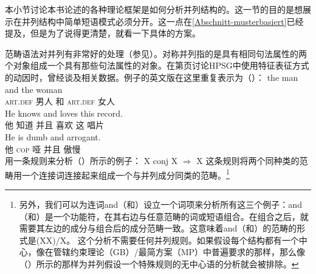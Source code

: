 \begin{exe}
\begin{xlist}[iv.]
\begin{exe}
\begin{xlist}[iv.]
本小节讨论本书论述的各种理论框架是如何分析并列结构的。这一节的目的是想展示在并列结构中简单短语模式必须分开。这一点在\ref{Abschnitt-musterbasiert}已经提及，但是为了说得更清楚，就看一下具体的方案。

范畴语法对并列有非常好的处理（参见\citet{Steedman91a}）。对称并列指的是具有相同句法属性的两个对象组成一个具有那些句法属性的对象。在第\pageref{Seite-HPSG-Koordination}页讨论HPSG中使用特征表征方式的动因时，曾经谈及相关数据。例子的英文版在这里重复表示为（）：
\eal
\ex 
\gll the man and the woman\\
     \textsc{art}.\textsc{def} 男人 和 \textsc{art}.\textsc{def} 女人\\
\ex 
\gll He knows and loves this record.\\
     他 知道 并且 喜欢 这 唱片\\
\ex 
\gll He is dumb and arrogant.\\
     他 \textsc{cop} 哑 并且  傲慢\\
\zl
 \citet{Steedman91a}用一条规则来分析（）所示的例子：
\ea
X conj X $\Rightarrow$ X
\z
这条规则将两个同种类的范畴用一个连接词连接起来组成一个与并列成分同类的范畴。\footnote{%
另外，我们可以为连词and（和）设立一个词项来分析所有这三个例子：and（和）是一个功能符，在其右边与任意范畴的词或短语组合。在组合之后，就需要其左边的成分与组合后的成分范畴一致。这意味着and（和）的范畴的形式是(X\bs X)/X。
这个分析不需要任何并列规则。如果假设每个结构都有一个中心，像在\indexgb 管辖约束理论（GB）/最简方案（MP）\indexmp 中普遍要求的那样，那么像（）所示的那样为并列假设一个特殊规则的无中心语的分析就会被排除。
}
\end{xlist}
\end{exe}
\end{xlist}
\end{exe}
